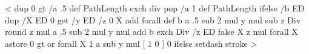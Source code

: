 \def\psls@dashed{%
  \ifpsdashadjust
    [ \psk@dash ] \pst@linetype\space \tx@DashLine
  \else
    [ \psk@dash ] 0 setdash stroke
  \fi}
<{
    dup 0 gt
    { /a .5 def PathLength exch div }
    { pop /a 1 def PathLength } ifelse
    /b ED %
    dup /X ED %
    0 get /y ED %
    /z 0 X {add} forall def %
    b a .5 sub 2 mul y mul sub z Div round
    z mul a .5 sub 2 mul y mul add b exch Div
    /z ED %
    false %
    X { z mul } forall X astore %
    {0 gt or} forall
    { X 1 a sub y mul }
    { [ 1 0 ] 0 }
    ifelse
    setdash stroke }>
%
%
%
\def\psFormatInt{\def\pst@par{}\pst@object{psFormatInt}}
\def\psFormatInt@i#1{{%
  \pst@killglue
  \use@par
  \count1=#1\count2=\count1
  \ifnum\count1=0 0\else
    \ifnum\count1>999999
    \count3=\count1
    \divide\count3 by 1000000
    \the\count3\psk@intSeparator\relax
    \multiply\count3 by 1000000
    \advance\count1 by -\count3 %
  \fi%
  \ifnum\count2>999
    \count3=\count1
    \divide\count3 by 1000
    \ifnum\count2>99999
	\ifnum\count3<100 0\fi
	\ifnum\count3<10 0\fi
    \fi%
    \the\count3\psk@intSeparator\relax
    \multiply\count3 by 1000
    \advance\count1 by -\count3 %
  \fi%
  \ifnum\count2>999
    \ifnum\count1<100 0\fi
    \ifnum\count1<10 0\fi
  \fi%
  \the\count1
  \fi%
}\ignorespaces}
%
\newdimen\pst@braceWidth
{}
%
\def\@@rput@iv(#1){\pst@killglue\pst@makebox{\@@rput@v{#1}}}
\def\@@rput@v#1{%
  \begingroup
    \use@par
    \pst@makesmall\pst@hbox
    \pst@Verb{%
      Alpha 90 sub \pst@number\pst@braceWidth  0 lt {180 add} if
      \ifx\psk@rot\@empty\else\psk@rot add \fi
      /rotAngle exch def
    }%
    \setbox\pst@hbox=\hbox{%
      \pst@Verb{rotAngle \tx@RotBegin}%
      \box\pst@hbox\pst@Verb{\tx@RotEnd}%
    }%
    \psput@{#1}\pst@hbox
  \endgroup
  \ignorespaces%
}
